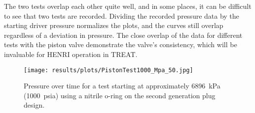 The two tests overlap each other quite well, and in some places, it can be difficult to see that two tests are recorded. Dividing the recorded pressure data by the starting driver pressure normalizes the plots, and the curves still overlap regardless of a deviation in pressure. The close overlap of the data for different tests with the piston valve demonstrate the valve's consistency, which will be invaluable for HENRI operation in TREAT.


\begin{figure}[htbp]
    \vspace{16pt}
    \centering
    \texttt{[image: results/plots/PistonTest1000\_Mpa\_50.jpg]}
    \caption{Pressure over time for a test starting at approximately \SI{6896}{\kilo\pascal} (\SI{1000}{psia}) using a nitrile o-ring on the second generation plug design.}
    \label{fig:piston 1000psi 50ms}
    \vspace{16pt}
\end{figure}


